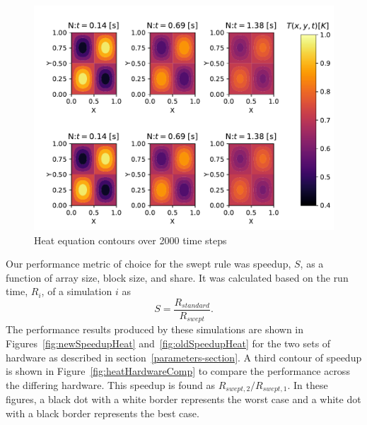 \documentclass[preprints,article,accept,moreauthors,pdftex]{Definitions/mdpi}
\newcommand\fs{0.7}
\begin{document}
\begin{figure}[H]
    
    \begin{center}
        \includegraphics[scale=\fs, trim={0.9cm 0.4cm 0.1cm 0.9cm},clip]{figs/heatValidate.pdf}
    \end{center}
    \caption{Heat equation contours over 2000 time steps}
    \label{fig:heatSurface}
\end{figure}




Our performance metric of choice for the swept rule was speedup, $S$, as a function of array size, block size, and share. It was calculated based on the run time, $R_i$, of a simulation $i$ as
\begin{equation}
    S = \frac{R_{standard}}{R_{swept}}.
\end{equation}
The performance results produced by these simulations are shown in Figures~\ref{fig:newSpeedupHeat} and~\ref{fig:oldSpeedupHeat} for the two sets of hardware as described in section~\ref{parameters-section}. 
A third contour of speedup is shown in Figure~\ref{fig:heatHardwareComp} to compare the performance across the differing hardware. This speedup is found as $R_{swept,2}/R_{swept,1}$. In these figures, a black dot with a white border represents the worst case and a white dot with a black border represents the best case.
\end{document}
